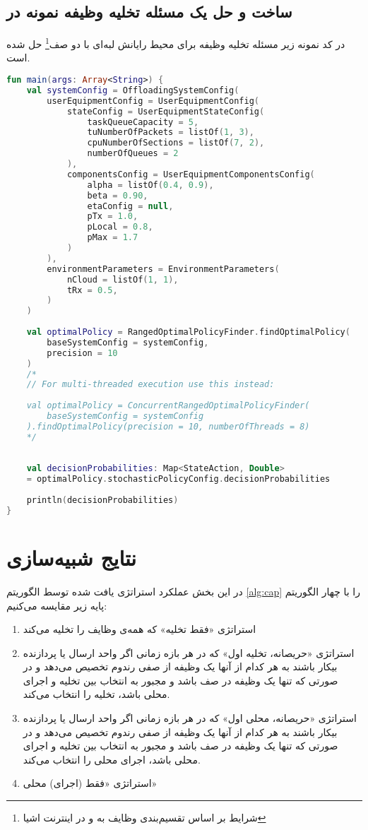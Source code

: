 \subsection{ساخت و حل یک مسئله تخلیه وظیفه نمونه در }
در کد نمونه زیر مسئله تخلیه وظیفه‌ برای محیط رایانش لبه‌ای با دو صف\footnote{شرایط بر اساس تقسیم‌بندی وظایف به  و  در اینترنت اشیا} حل شده است.
\begin{latin}
	\begin{lstlisting}[language=Kotlin]
fun main(args: Array<String>) {
	val systemConfig = OffloadingSystemConfig(
		userEquipmentConfig = UserEquipmentConfig(
			stateConfig = UserEquipmentStateConfig(
				taskQueueCapacity = 5,
				tuNumberOfPackets = listOf(1, 3),
				cpuNumberOfSections = listOf(7, 2),
				numberOfQueues = 2
			),
			componentsConfig = UserEquipmentComponentsConfig(
				alpha = listOf(0.4, 0.9),
				beta = 0.90,
				etaConfig = null,
				pTx = 1.0,
				pLocal = 0.8,
				pMax = 1.7
			)
		),
		environmentParameters = EnvironmentParameters(
			nCloud = listOf(1, 1),
			tRx = 0.5,
		)
	)
	
	val optimalPolicy = RangedOptimalPolicyFinder.findOptimalPolicy(
		baseSystemConfig = systemConfig, 
		precision = 10
	)
	/*
	// For multi-threaded execution use this instead:
	
	val optimalPolicy = ConcurrentRangedOptimalPolicyFinder(
		baseSystemConfig = systemConfig
	).findOptimalPolicy(precision = 10, numberOfThreads = 8)
	*/
	
	
	val decisionProbabilities: Map<StateAction, Double>
	= optimalPolicy.stochasticPolicyConfig.decisionProbabilities
	
	println(decisionProbabilities)
}
	\end{lstlisting}
\end{latin}
\newpage
\section{نتایج شبیه‌سازی}
در این بخش عملکرد استراتژی یافت شده توسط الگوریتم \ref{alg:cap} را با چهار الگوریتم پایه زیر مقایسه می‌کنیم:
\begin{enumerate}
	\item استراتژی «فقط تخلیه» که همه‌ی وظایف را تخلیه می‌کند
	\item استراتژی «حریصانه، تخلیه اول» که در هر بازه زمانی اگر واحد ارسال یا پردازنده بیکار باشند به هر کدام از آنها یک وظیفه از صفی رندوم تخصیص می‌دهد و در صورتی که تنها یک وظیفه در صف باشد و مجبور به انتخاب بین تخلیه و اجرای محلی باشد، تخلیه را انتخاب می‌کند.
	\item استراتژی «حریصانه، محلی اول» که در هر بازه زمانی اگر واحد ارسال یا پردازنده بیکار باشند به هر کدام از آنها یک وظیفه از صفی رندوم تخصیص می‌دهد و در صورتی که تنها یک وظیفه در صف باشد و مجبور به انتخاب بین تخلیه و اجرای محلی باشد، اجرای محلی را انتخاب می‌کند.
	\item استراتژی «فقط (اجرای) محلی»
\end{enumerate}
\newpage
